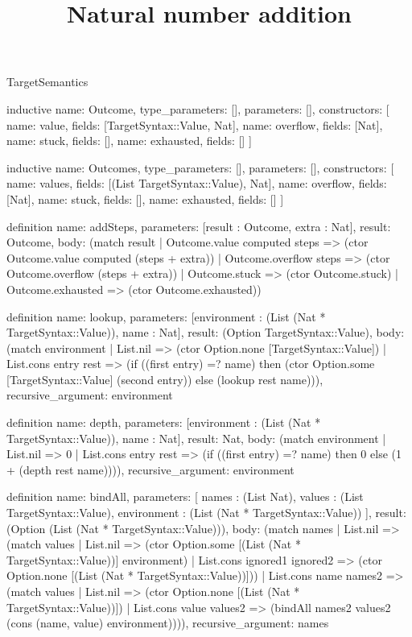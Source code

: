 \begin{lexlean}{TargetSemantics}
\title{Natural number addition}
\begin{semanticmodule}
inductive{
  name: Outcome,
  type_parameters: [],
  parameters: [],
  constructors: [
    {name: value, fields: [TargetSyntax::Value, Nat]},
    {name: overflow, fields: [Nat]},
    {name: stuck, fields: []},
    {name: exhausted, fields: []}
  ]
}

inductive{
  name: Outcomes,
  type_parameters: [],
  parameters: [],
  constructors: [
    {name: values, fields: [(List TargetSyntax::Value), Nat]},
    {name: overflow, fields: [Nat]},
    {name: stuck, fields: []},
    {name: exhausted, fields: []}
  ]
}

definition{
  name: addSteps,
  parameters: [result : Outcome, extra : Nat],
  result: Outcome,
  body: (match result
    | Outcome.value computed steps => (ctor Outcome.value computed (steps + extra))
    | Outcome.overflow steps => (ctor Outcome.overflow (steps + extra))
    | Outcome.stuck => (ctor Outcome.stuck)
    | Outcome.exhausted => (ctor Outcome.exhausted))
}

definition{
  name: lookup,
  parameters: [environment : (List (Nat * TargetSyntax::Value)), name : Nat],
  result: (Option TargetSyntax::Value),
  body: (match environment
    | List.nil => (ctor Option.none [TargetSyntax::Value])
    | List.cons entry rest => (if ((first entry) =? name) then (ctor Option.some [TargetSyntax::Value] (second entry)) else (lookup rest name))),
  recursive_argument: environment
}

definition{
  name: depth,
  parameters: [environment : (List (Nat * TargetSyntax::Value)), name : Nat],
  result: Nat,
  body: (match environment
    | List.nil => 0
    | List.cons entry rest => (if ((first entry) =? name) then 0 else (1 + (depth rest name)))),
  recursive_argument: environment
}

definition{
  name: bindAll,
  parameters: [
    names : (List Nat),
    values : (List TargetSyntax::Value),
    environment : (List (Nat * TargetSyntax::Value))
  ],
  result: (Option (List (Nat * TargetSyntax::Value))),
  body: (match names
    | List.nil => (match values
      | List.nil => (ctor Option.some [(List (Nat * TargetSyntax::Value))] environment)
      | List.cons ignored1 ignored2 => (ctor Option.none [(List (Nat * TargetSyntax::Value))]))
    | List.cons name names2 => (match values
      | List.nil => (ctor Option.none [(List (Nat * TargetSyntax::Value))])
      | List.cons value values2 => (bindAll names2 values2 (cons (name, value) environment)))),
  recursive_argument: names
}


\end{semanticmodule}
\end{lexlean}
